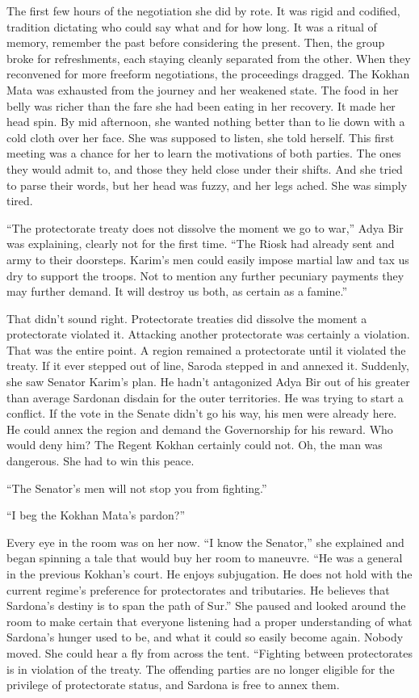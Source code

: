 \documentclass{article}
\begin{document}
	The first few hours of the negotiation she did by rote. It was rigid and codified, tradition dictating who could say what and for how long. It was a ritual of memory, remember the past before considering the present. Then, the group broke for refreshments, each staying cleanly separated from the other. When they reconvened for more freeform negotiations, the proceedings dragged. The Kokhan Mata was exhausted from the journey and her weakened state. The food in her belly was richer than the fare she had been eating in her recovery. It made her head spin. By mid afternoon, she wanted nothing better than to lie down with a cold cloth over her face. She was supposed to listen, she told herself. This first meeting was a chance for her to learn the motivations of both parties. The ones they would admit to, and those they held close under their shifts. And she tried to parse their words, but her head was fuzzy, and her legs ached. She was simply tired.
	
	“The protectorate treaty does not dissolve the moment we go to war,” Adya Bir was explaining, clearly not for the first time. “The Riosk had already sent and army to their doorsteps. Karim’s men could easily impose martial law and tax us dry to support the troops. Not to mention any further pecuniary payments they may further demand. It will destroy us both, as certain as a famine.” 
	
	That didn’t sound right. Protectorate treaties did dissolve the moment a protectorate violated it. Attacking another protectorate was certainly a violation. That was the entire point. A region remained a protectorate until it violated the treaty. If it ever stepped out of line, Saroda stepped in and annexed it. Suddenly, she saw Senator Karim’s plan. He hadn’t antagonized Adya Bir out of his greater than average Sardonan disdain for the outer territories. He was trying to start a conflict. If the vote in the Senate didn’t go his way, his men were already here. He could annex the region and demand the Governorship for his reward. Who would deny him? The Regent Kokhan certainly could not. Oh, the man was dangerous. She had to win this peace.
	
	“The Senator’s men will not stop you from fighting.” 
	
	“I beg the Kokhan Mata’s pardon?”
	
	Every eye in the room was on her now. “I know the Senator,” she explained and began spinning a tale that would buy her room to maneuvre. “He was a general in the previous Kokhan’s court. He enjoys subjugation. He does not hold with the current regime's preference for protectorates and tributaries. He believes that Sardona’s destiny is to span the path of Sur.” She paused and looked around the room to make certain that everyone listening had a proper understanding of what Sardona’s hunger used to be, and what it could so easily become again. Nobody moved. She could hear a fly from across the tent. “Fighting between protectorates is in violation of the treaty. The offending parties are no longer eligible for the privilege of protectorate status, and Sardona is free to annex them.
	
\end{document}
